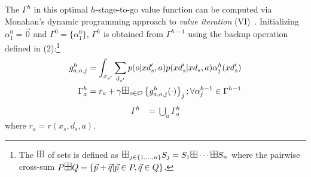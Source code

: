 \documentclass{article} %
\begin{document}
The $\Gamma^h$ in this optimal $h$-stage-to-go value function can be
computed via Monahan's dynamic programming approach to \emph{value
iteration} (VI)~\cite{monahan82}.  
Initializing  $\alpha^0_1 = \vec{0}$ and $\Gamma^0 = \{ \alpha^0_1 \}$, $\Gamma^h$ is obtained from $\Gamma^{h-1}$ using the backup operation defined in (2):\footnote{The $\textrm{\large $\boxplus$}$ of sets is defined as 
$\textrm{\large $\boxplus$}_{j \in \{ 1,\ldots, n \} } S_j = S_1 \textrm{\large $\boxplus$} \cdots \textrm{\large $\boxplus$} S_n$ where the pairwise cross-sum $P 
\textrm{\large $\boxplus$} Q = \{ \vec{p} + \vec{q} | \vec{p} \in P, \vec{q} \in Q \}$.}
{\footnotesize
\begin{align} 
g^h_{a,o,j} &=  \int_{x_{s'}} \sum_{d_{s'}} p(o|xd'_s,a)p(xd'_s|xd_s,a) \alpha^h_j(xd'_s) \label{eq:backup} \\
\Gamma^{h}_a   &= r_a + \gamma \textrm{\large $\boxplus$}_{o \in \mathcal{O}} \left\{ g^h_{a,o,j}(\cdot) \right\}_j ;  \forall \alpha^{h-1}_{j} \in \Gamma^{h-1}  \label{eq:cross_prod} 
\end{align}
\begin{align}
\Gamma^h  &= \bigcup_a \Gamma^h_a 
\end{align}
}
where $r_a = r(x_s,d_s,a)$.  
\end{document}
